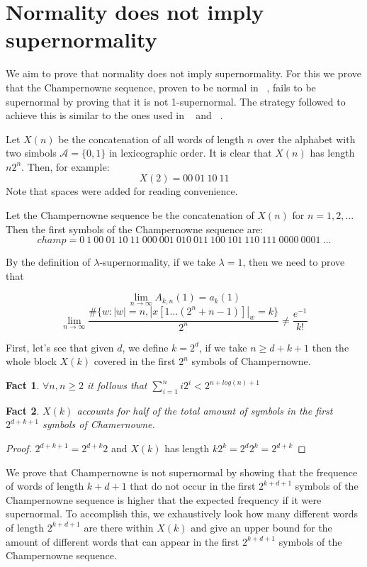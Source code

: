 \documentclass[11pt,a4paper]{tesis}
\newtheorem{fact}{Fact}[section]
\theoremstyle{definition}
\begin{document}
\section{Normality does not imply supernormality}
We aim to prove that normality does not imply supernormality. For this we prove that the Champernowne sequence, proven to be normal in ~\cite{BC2018}, fails to be supernormal by proving that it is not 1-supernormal.
The strategy followed to achieve this is similar to the ones used in ~\cite{BCC2019} and  ~\cite{PS2019}.


Let $X(n)$ be the concatenation of all words of length $n$ over the alphabet with two simbols $\mathcal{A}=\{0,1\}$ in lexicographic order.  It is clear that $X(n)$ has length $n2^n$. Then, for example:
$$X(2) = 00 \: 01 \: 10 \: 11$$
Note that spaces were added for reading convenience.

Let the Champernowne sequence be the concatenation of $X(n)$ for $n = 1,2,\dots$ Then the first symbols of the Champernowne sequence are:
$$champ = 0 \: 1 \: 00 \: 01 \: 10 \: 11 \: 000 \: 001 \: 010 \: 011 \: 100 \: 101 \: 110 \: 111 \: 0000 \: 0001 \: \dots$$

By the definition of $\lambda$-supernormality, if we take $\lambda = 1$, then we need to prove that

$$\lim_{n\to\infty} A_{k,n}(1) = a_k(1)$$
$$\lim_{n\to\infty} \frac{\#\{w: |w| = n  , |x[1...(2^n+n-1)]|_w = k\}}{2^n} \neq \frac{e^{-1}}{k!}$$

\bigskip

First, let's see that given $d$, we define $k = 2^d$, if we take $n \geq d + k + 1$ then the whole block $X(k)$ covered in the first $2^n$ symbols of Champernowne.


\begin{fact}
    $\forall n, n  \geq 2$ it follows that $\sum_{i=1}^n i2^i < 2^{n + log(n) + 1}$ 
\end{fact}

\begin{fact} \label{p2}
    $X(k)$ accounts for half of the total amount of symbols in the first $2^{d+k+1}$ symbols of Chamernowne.
\end{fact}
\begin{proof}
    $2^{d+k+1} = 2^{d+k}2$ and $X(k)$ has length $k2^k = 2^d2^k = 2^{d+k}$ 
\end{proof}

We prove that Champernowne is not supernormal by showing that the frequence of words of length $k+d+1$ that do not occur in the first $2^{k+d+1}$ symbols of the Champernowne sequence is higher that the expected frequency if it were supernormal.
To accomplish this, we exhaustively look how many different words of length $2^{k+d+1}$ are there within $X(k)$ and give an upper bound for the amount of different words that can appear in the first $2^{k+d+1}$ symbols of the Champernowne sequence.
\end{document}
